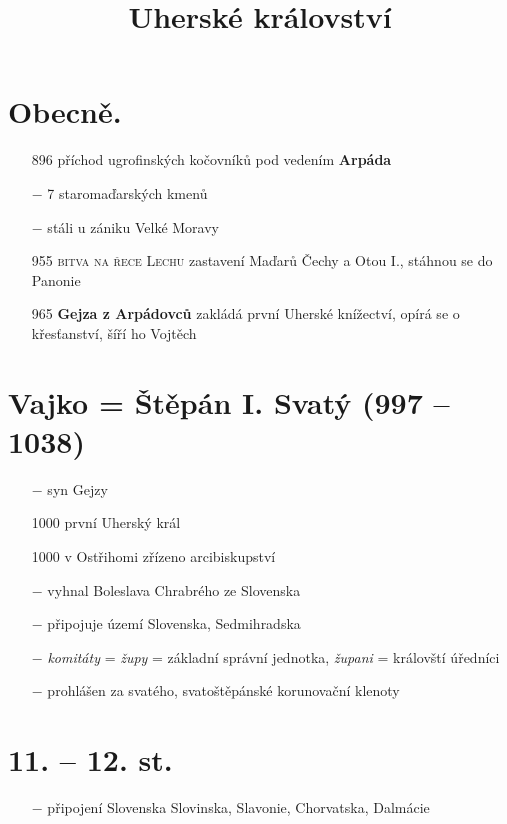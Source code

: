 \documentclass{article}
\title{\vspace{-2cm}Uherské království\vspace{-1.7cm}}
\date{}
\author{}
\begin{document}
\maketitle

\section*{Obecně.}
\begin{itemize}
    \vspace{-0.5em}
    \setlength\itemsep{0.15em}
    \item[896] příchod ugrofinských kočovníků pod vedením \textbf{Arpáda}
    \item[$-$] 7 staromaďarských kmenů
    \item[$-$] stáli u zániku Velké Moravy
    \item[955] \textsc{bitva na řece Lechu} zastavení Maďarů Čechy a Otou I., stáhnou se do Panonie
    \item[965] \textbf{Gejza z Arpádovců} zakládá první Uherské knížectví, opírá se o křesťanství, šíří ho Vojtěch
\end{itemize}

\section*{Vajko = Štěpán I. Svatý (997 -- 1038)}
\begin{itemize}
    \vspace{-0.5em}
    \setlength\itemsep{0.15em}
    \item[$-$] syn Gejzy
    \item[1000] první Uherský král
    \item[1000] v Ostřihomi zřízeno arcibiskupství
    \item[$-$] vyhnal Boleslava Chrabrého ze Slovenska
    \item[$-$] připojuje území Slovenska, Sedmihradska
    \item[$-$] \textit{komitáty} = \textit{župy} = základní správní jednotka, \textit{župani} = královští úředníci
    \item[$-$] prohlášen za svatého, svatoštěpánské korunovační klenoty
\end{itemize}

\section*{11. -- 12. st.}
\begin{itemize}
    \vspace{-0.5em}
    \setlength\itemsep{0.15em}
    \item[$-$] připojení Slovenska Slovinska, Slavonie, Chorvatska, Dalmácie
\end{itemize}
\end{document}
